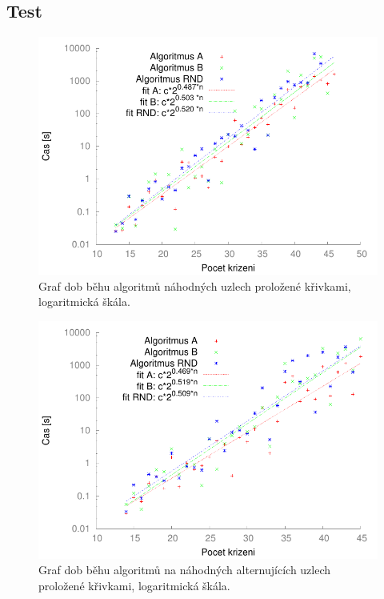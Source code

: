 \subsection{Test}

\begin{figure}[p]\centering
\includegraphics{../img/knotsFIT}
\caption{Graf dob běhu algoritmů náhodných uzlech proložené křivkami, logaritmická škála.}
\label{obr03:knotSrov}
\end{figure}

\begin{figure}[p]\centering
\includegraphics{../img/alt_knotsFIT}
\caption{Graf dob běhu algoritmů na náhodných alternujících uzlech proložené křivkami, logaritmická škála.}
\label{obr03:altSrov}
\end{figure}

